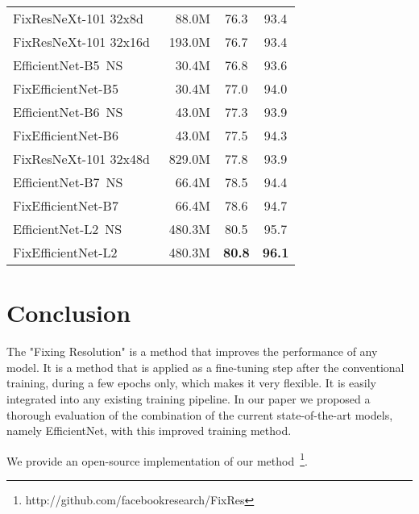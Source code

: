 \documentclass{article}
\begin{document}
\begin{table}
{\begin{tabular}{|l@{}r|cc|}
    FixResNeXt-101 32x8d~\cite{Touvron2019FixRes}    &   88.0M &   76.3   &  93.4 \\
    
    FixResNeXt-101 32x16d~\cite{Touvron2019FixRes}  &   193.0M   &  76.7  &  93.4 \\
    
    EfficientNet-B5~NS~\cite{Xie2019SelftrainingWN}&  30.4M & 76.8   & 93.6 \\
    FixEfficientNet-B5 & 30.4M & 77.0   & 94.0 \\
    
    EfficientNet-B6~NS~\cite{Xie2019SelftrainingWN}&  43.0M & 77.3   & 93.9 \\
    FixEfficientNet-B6  & 43.0M & 77.5   & 94.3 \\
    
    FixResNeXt-101 32x48d~\cite{Touvron2019FixRes}  &   829.0M &   77.8   &  93.9 \\
        
    EfficientNet-B7~NS~\cite{Xie2019SelftrainingWN} & 66.4M & 78.5   & 94.4 \\
    FixEfficientNet-B7 & 66.4M & 78.6   & 94.7 \\
    
    EfficientNet-L2~NS~\cite{Xie2019SelftrainingWN} & 480.3M & 80.5   & 95.7 \\
    FixEfficientNet-L2 &  480.3M & \textbf{80.8}   & \textbf{96.1} \\
    
      \bottomrule
    \end{tabular}}
    \end{table}
    
    

 
\section{Conclusion}
\label{sec:conclusion}

The "Fixing Resolution" is a method that improves the performance of any model. 
It is a method that is applied as a fine-tuning step after the conventional training, during a few epochs only, which makes it very flexible. 
It is easily integrated into any existing training pipeline.
In our paper we proposed a thorough evaluation of the combination of the current state-of-the-art models, namely EfficientNet, with this improved training method. 

We provide an open-source implementation of our method~\footnote{http://github.com/facebookresearch/FixRes}.







\end{document}
